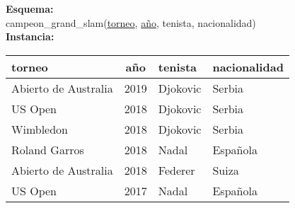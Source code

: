 \documentclass[preview]{standalone}
\begin{document}
\textbf{Esquema:}\\
campeon\_grand\_slam(\underline{torneo}, \underline{a\~no}, tenista, nacionalidad)\\

\textbf{Instancia:}
\begin{center}
\begin{tabular}{| l | c | l | l |}\hline			
	torneo & a\~no & tenista & nacionalidad  \\\hline			
	Abierto de Australia & 2019 & Djokovic & Serbia \\
	US Open & 2018 & Djokovic & Serbia \\
	Wimbledon & 2018 & Djokovic & Serbia \\
	Roland Garros & 2018 & Nadal & Espa\~nola \\
	Abierto de Australia & 2018 & Federer & Suiza \\
	US Open & 2017 & Nadal & Espa\~nola \\\hline
\end{tabular}
\end{center}
\end{document}
